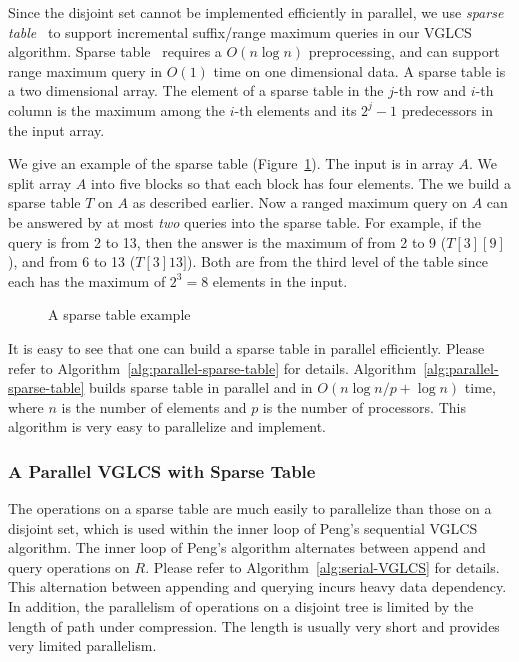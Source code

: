Since the disjoint set cannot be implemented efficiently in parallel,
we use {\em sparse table}~\cite{Berkman1993RecursiveSP} to support
incremental suffix/range maximum queries in our VGLCS algorithm.
Sparse table~\cite{Berkman1993RecursiveSP} requires a $O(n \log n)$
preprocessing, and can support range maximum query in $O(1)$ time on
one dimensional data.  A sparse table is a two dimensional array.  The
element of a sparse table in the $j$-th row and $i$-th column is the
maximum among the $i$-th elements and its $2^j - 1$ predecessors in
the input array.

We give an example of the sparse table
(Figure~\ref{fig:interval-decomposition}).  The input is in array
$A$. We split array $A$ into five blocks so that each block has four
elements.  The we build a sparse table $T$ on $A$ as described
earlier.  Now a ranged maximum query on $A$ can be answered by at most
{\em two} queries into the sparse table.  For example, if the query is
from 2 to 13, then the answer is the maximum of from 2 to 9
($T[3][9]$), and from 6 to 13 ($T[3]13]$).  Both are from the third
  level of the table since each has the maximum of $2^3 = 8$ elements
  in the input.

\begin{figure}[!thb]
  \centering {} 
  \caption{A sparse table example}
  \label{fig:interval-decomposition}
\end{figure}

It is easy to see that one can build a sparse table in parallel
efficiently.  Please refer to
Algorithm~\ref{alg:parallel-sparse-table} for details.
Algorithm~\ref{alg:parallel-sparse-table} builds sparse table in
parallel and in $O(n \log n / p + \log n)$ time, where $n$ is the
number of elements and $p$ is the number of processors.  This
algorithm is very easy to parallelize and implement.



\subsubsection{A Parallel VGLCS with Sparse Table}

The operations on a sparse table are much easily to parallelize than
those on a disjoint set, which is used within the inner loop of Peng's
sequential VGLCS algorithm.  The inner loop of Peng's algorithm
alternates between append and query operations on $R$.  Please refer
to Algorithm~\ref{alg:serial-VGLCS} for details.  This alternation
between appending and querying incurs heavy data dependency.  In
addition, the parallelism of operations on a disjoint tree is limited
by the length of path under compression.  The length is usually very
short and provides very limited parallelism.

